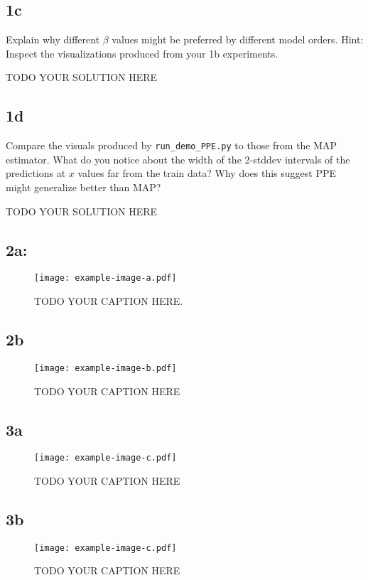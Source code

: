 \documentclass[10pt]{article}
\newcommand{\officialdirections}[1]{{\color{purple} #1}}
\begin{document}
\subsection{1c}
\officialdirections{Explain why different $\beta$ values might be preferred by different model orders. Hint: Inspect the visualizations produced from your 1b experiments.
}

TODO YOUR SOLUTION HERE

\subsection{1d}

\officialdirections{Compare the visuals produced by \texttt{run\_demo\_PPE.py} to those from the MAP estimator. What do you notice about the width of the 2-stddev intervals of the predictions at $x$ values far from the train data? Why does this suggest PPE might generalize better than MAP?}

TODO YOUR SOLUTION HERE
\newpage 

\subsection{2a: }
\renewcommand{\figurename}{Fig.}
\renewcommand{\thefigure}{2a}
 \begin{figure}[!h]
     \centering
     \texttt{[image: example-image-a.pdf]}
     \label{fig:2a}
\caption{TODO YOUR CAPTION HERE. 
}%
 \end{figure}

\newpage 

\subsection{2b}
\renewcommand{\thefigure}{2b}
 \begin{figure}[!h]
     \centering
     \texttt{[image: example-image-b.pdf]}
     \label{fig:2b}
\caption{
TODO YOUR CAPTION HERE
}%
 \end{figure}

\newpage 

\subsection{3a}
\renewcommand{\thefigure}{3a}
 \begin{figure}[!h]
     \centering
     \texttt{[image: example-image-c.pdf]}
     \label{fig:3a}
     \caption{
TODO YOUR CAPTION HERE
}%
 \end{figure}

\newpage 

\subsection{3b}
\renewcommand{\thefigure}{3b}
 \begin{figure}[!h]
     \centering
     \texttt{[image: example-image-c.pdf]}
     \label{fig:3b}
\caption{
TODO YOUR CAPTION HERE
}%
 \end{figure}
 
\end{document}
